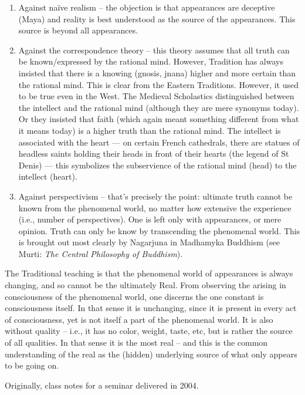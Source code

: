 \begin{enumerate}
\item Against naïve realism – the objection is that appearances are deceptive (Maya) and reality is best understood as the source of the appearances. This source is beyond all appearances. 
\item Against the correspondence theory – this theory assumes that all truth can be known/expressed by the rational mind. However, Tradition has always insisted that there is a knowing (gnosis, jnana) higher and more certain than the rational mind. This is clear from the Eastern Traditions. However, it used to be true even in the West. The Medieval Scholastics distinguished between the intellect and the rational mind (although they are mere synonyms today). Or they insisted that faith (which again meant something different from what it means today) is a higher truth than the rational mind. The intellect is associated with the heart — on certain French cathedrals, there are statues of headless saints holding their heads in front of their hearts (the legend of St Denis) — this symbolizes the subservience of the rational mind (head) to the intellect (heart). 
\item Against perspectivism – that's precisely the point: ultimate truth cannot be known from the phenomenal world, no matter how extensive the experience (i.e., number of perspectives). One is left only with appearances, or mere opinion. Truth can only be know by transcending the phenomenal world. This is brought out most clearly by Nagarjuna in Madhamyka Buddhism (see Murti: \emph{The Central Philosophy of Buddhism}). 
\end{enumerate}
The Traditional teaching is that the phenomenal world of appearances is always changing, and so cannot be the ultimately Real. From observing the arising in consciousness of the phenomenal world, one discerns the one constant is consciousness itself. In that sense it is unchanging, since it is present in every act of consciousness, yet is not itself a part of the phenomenal world. It is also without quality – i.e., it has no color, weight, taste, etc, but is rather the source of all qualities. In that sense it is the most real – and this is the common understanding of the real as the (hidden) underlying source of what only appears to be going on.


\hfill

Originally, class notes for a seminar delivered in 2004.




